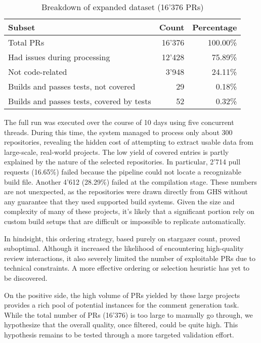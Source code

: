 \begin{table}[ht]
	\centering
	\begin{tabular}{lrr}
		\toprule
		\textbf{Subset}                           & \textbf{Count} & \textbf{Percentage} \\
		\midrule
		Total PRs                                 & 16'376         & 100.00\%            \\
		Had issues during processing              & 12'428         & 75.89\%             \\
		Not code-related                          & 3'948          & 24.11\%             \\
		Builds and passes tests, not covered      & 29             & 0.18\%              \\
		Builds and passes tests, covered by tests & 52             & 0.32\%              \\
		\bottomrule
	\end{tabular}
	\caption{Breakdown of expanded dataset (16'376 PRs)}
	\label{tab:expanded-distribution}
\end{table}

The full run was executed over the course of 10 days using five concurrent threads. During this
time, the system managed to process only about 300 repositories, revealing the hidden cost of
attempting to extract usable data from large-scale, real-world projects. The low yield of covered
entries is partly explained by the nature of the selected repositories. In particular, 2'714 pull
requests (16.65\%) failed because the pipeline could not locate a recognizable build file. Another
4'612 (28.29\%) failed at the compilation stage. These numbers are not unexpected, as the
repositories were drawn directly from GHS without any guarantee that they used supported build
systems. Given the size and complexity of many of these projects, it's likely that a significant
portion rely on custom build setups that are difficult or impossible to replicate automatically.

In hindsight, this ordering strategy, based purely on stargazer count, proved suboptimal. Although
it increased the likelihood of encountering high-quality review interactions, it also severely
limited the number of exploitable PRs due to technical constraints. A more effective ordering or
selection heuristic has yet to be discovered.

On the positive side, the high volume of PRs yielded by these large projects provides a rich pool of
potential instances for the comment generation task. While the total number of PRs (16'376) is too
large to manually go through, we hypothesize that the overall quality, once filtered, could be quite
high. This hypothesis remains to be tested through a more targeted validation effort.

